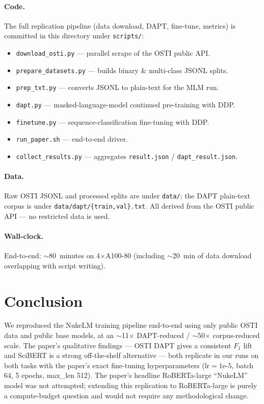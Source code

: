 \documentclass[11pt]{article}
\begin{document}
\paragraph{Code.} The full replication pipeline (data download, DAPT, fine-tune, metrics) is committed in this directory under \texttt{scripts/}:
\begin{itemize}
\item \texttt{download\_osti.py} --- parallel scrape of the OSTI public API.
\item \texttt{prepare\_datasets.py} --- builds binary \& multi-class JSONL splits.
\item \texttt{prep\_txt.py} --- converts JSONL to plain-text for the MLM run.
\item \texttt{dapt.py} --- masked-language-model continued pre-training with DDP.
\item \texttt{finetune.py} --- sequence-classification fine-tuning with DDP.
\item \texttt{run\_paper.sh} --- end-to-end driver.
\item \texttt{collect\_results.py} --- aggregates \texttt{result.json} / \texttt{dapt\_result.json}.
\end{itemize}
\paragraph{Data.} Raw OSTI JSONL and processed splits are under \texttt{data/}; the DAPT plain-text corpus is under \texttt{data/dapt/\{train,val\}.txt}. All derived from the OSTI public API --- no restricted data is used.

\paragraph{Wall-clock.} End-to-end: $\sim$80~minutes on 4$\times$A100-80 (including $\sim$20~min of data download overlapping with script writing).

\section{Conclusion}

We reproduced the NukeLM training pipeline end-to-end using only public OSTI data and public base models, at an $\sim$11$\times$ DAPT-reduced / $\sim$50$\times$ corpus-reduced scale. The paper's qualitative findings --- OSTI DAPT gives a consistent $F_1$ lift and SciBERT is a strong off-the-shelf alternative --- both replicate in our runs on both tasks with the paper's exact fine-tuning hyperparameters ($\text{lr}=1\text{e-}5$, batch 64, 5 epochs, max\_len 512). The paper's headline RoBERTa-large ``NukeLM'' model was not attempted; extending this replication to RoBERTa-large is purely a compute-budget question and would not require any methodological change.
\end{document}
